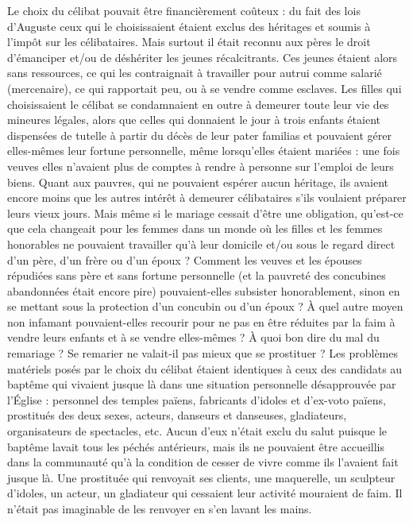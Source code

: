  Le choix du célibat pouvait être financièrement coûteux : du fait des lois d'Auguste ceux qui le choisissaient étaient exclus des héritages et soumis à l'impôt sur les célibataires. Mais surtout il était reconnu aux pères le droit d'émanciper et/ou de déshériter les jeunes récalcitrants. Ces jeunes étaient alors sans ressources, ce qui les contraignait à travailler pour autrui comme salarié (mercenaire), ce qui rapportait peu, ou à se vendre comme esclaves. Les filles qui choisissaient le célibat se condamnaient en outre à demeurer toute leur vie des mineures légales, alors que celles qui donnaient le jour à trois enfants étaient dispensées de tutelle à partir du décès de leur pater familias et pouvaient gérer elles-mêmes leur fortune personnelle, même lorsqu'elles étaient mariées : une fois veuves elles n'avaient plus de comptes à rendre à personne sur l'emploi de leurs biens. Quant aux pauvres, qui ne pouvaient espérer aucun héritage, ils avaient encore moins que les autres intérêt à demeurer célibataires s'ils voulaient préparer leurs vieux jours. 
 Mais même si le mariage cessait d'être une obligation, qu'est-ce que cela changeait pour les femmes dans un monde où les filles et les femmes honorables ne pouvaient travailler qu'à leur domicile et/ou sous le regard direct d'un père, d'un frère ou d'un époux ? Comment les veuves et les épouses répudiées sans père et sans fortune personnelle (et la pauvreté des concubines abandonnées était encore pire) pouvaient-elles subsister honorablement, sinon en se mettant sous la protection d'un concubin ou d'un époux ? À quel autre moyen non infamant pouvaient-elles recourir pour ne pas en être réduites par la faim à vendre leurs enfants et à se vendre elles-mêmes ? À quoi bon dire du mal du remariage ? Se remarier ne valait-il pas mieux que se prostituer ?
 Les problèmes matériels posés par le choix du célibat étaient identiques à ceux des candidats au baptême qui vivaient jusque là dans une situation personnelle désapprouvée par l'Église : personnel des temples païens, fabricants d'idoles et d'ex-voto païens, prostitués des deux sexes, acteurs, danseurs et danseuses, gladiateurs, organisateurs de spectacles, etc. Aucun d'eux n'était exclu du salut puisque le baptême lavait tous les péchés antérieurs, mais ils ne pouvaient être accueillis dans la communauté qu'à la condition de cesser de vivre comme ils l'avaient fait jusque là. Une prostituée qui renvoyait ses clients, une maquerelle, un sculpteur d'idoles, un acteur, un gladiateur qui cessaient leur activité mouraient de faim. Il n'était pas imaginable de les renvoyer en s'en lavant les mains. 
